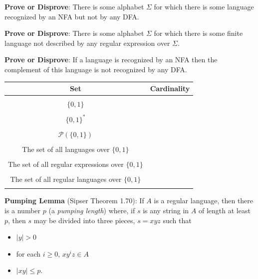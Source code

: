 \documentclass[12pt, oneside]{article}
\begin{document}
{\bf Prove or Disprove}: There is some alphabet $\Sigma$ for which there is 
some language recognized by an NFA but not by any DFA.

\vspace{30pt}

{\bf Prove or Disprove}: There is some alphabet $\Sigma$ for which there is 
some finite language not described by any regular expression over $\Sigma$.

\vspace{30pt}


{\bf Prove or Disprove}: If a language is recognized by an NFA 
then the complement of this language is not recognized by any DFA.

\vspace{30pt}


\newpage
\begin{center}
\begin{tabular}{c|c}
Set & Cardinality \\
\hline
& \\
$\{0,1\}$ & \\
& \\
$\{0,1\}^*$ & \\
& \\
$\mathcal{P}( \{0,1\})$ & \\
& \\
The set of all languages over $\{0,1\}$ & \\
& \\
The set of all regular expressions over $\{0,1\}$ & \\
& \\
The set of all regular languages over $\{0,1\}$ & \\
& \\
\end{tabular}
\end{center}



\vfill

\newpage

{\bf Pumping Lemma} (Sipser Theorem 1.70): If $A$ is a regular language, then there
is a number $p$ (a {\it pumping length}) where, if $s$ is any string in $A$ of length at least $p$, 
then $s$ may be divided into three pieces, $s = xyz$ such that
\vspace{-10pt}
\begin{itemize}
\item $|y| > 0$
\item for each $i \geq 0$, $xy^i z \in A$
\item $|xy| \leq p$.
\end{itemize}
\end{document}
